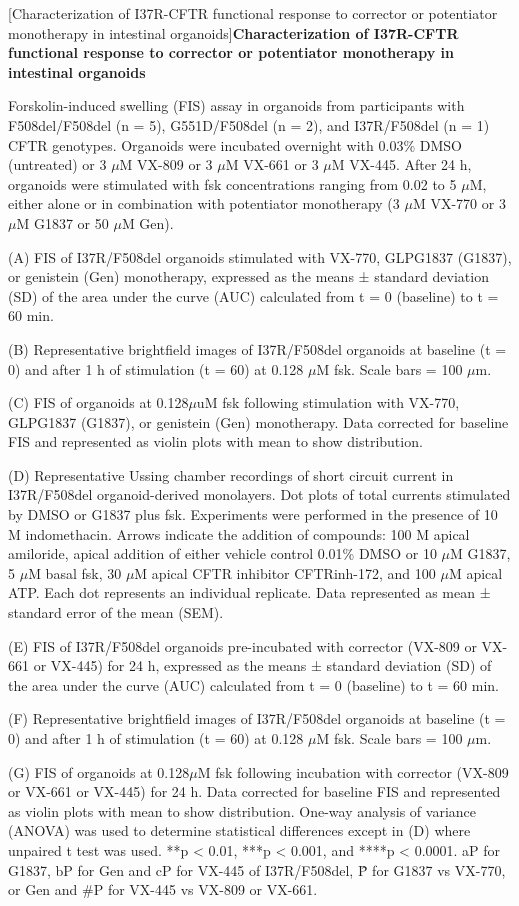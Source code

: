 [Characterization of I37R-CFTR functional response to corrector or potentiator monotherapy in intestinal organoids]{\textbf{Characterization of I37R-CFTR functional response to corrector or potentiator monotherapy in intestinal organoids}}{%
Forskolin-induced swelling (FIS) assay in organoids from participants with F508del/F508del (n = 5), G551D/F508del (n = 2), and I37R/F508del (n = 1) CFTR genotypes. Organoids were incubated overnight with 0.03\% DMSO (untreated) or 3 $\mu$M VX-809 or 3 $\mu$M VX-661 or 3 $\mu$M VX-445. After 24 h, organoids were stimulated with fsk concentrations ranging from 0.02 to 5 $\mu$M, either alone or in combination with potentiator monotherapy (3 $\mu$M VX-770 or 3 $\mu$M G1837 or 50 $\mu$M Gen).

(A) FIS of I37R/F508del organoids stimulated with VX-770, GLPG1837 (G1837), or genistein (Gen) monotherapy, expressed as the means ± standard deviation (SD) of the area under the curve (AUC) calculated from t = 0 (baseline) to t = 60 min.

(B) Representative brightfield images of I37R/F508del organoids at baseline (t = 0) and after 1 h of stimulation (t = 60) at 0.128 $\mu$M fsk. Scale bars = 100 $\mu$m.

(C) FIS of organoids at 0.128$\mu$uM fsk following stimulation with VX-770, GLPG1837 (G1837), or genistein (Gen) monotherapy. Data corrected for baseline FIS and represented as violin plots with mean to show distribution.

(D) Representative Ussing chamber recordings of short circuit current in I37R/F508del organoid-derived monolayers. Dot plots of total currents stimulated by DMSO or G1837 plus fsk. Experiments were performed in the presence of 10 M indomethacin. Arrows indicate the addition of compounds: 100 M apical amiloride, apical addition of either vehicle control 0.01\% DMSO or 10 $\mu$M G1837, 5 $\mu$M basal fsk, 30 $\mu$M apical CFTR inhibitor CFTRinh-172, and 100 $\mu$M apical ATP. Each dot represents an individual replicate. Data represented as mean ± standard error of the mean (SEM).

(E) FIS of I37R/F508del organoids pre-incubated with corrector (VX-809 or VX-661 or VX-445) for 24 h, expressed as the means ± standard deviation (SD) of the area under the curve (AUC) calculated from t = 0 (baseline) to t = 60 min.

(F) Representative brightfield images of I37R/F508del organoids at baseline (t = 0) and after 1 h of stimulation (t = 60) at 0.128 $\mu$M fsk. Scale bars = 100 $\mu$m.

(G) FIS of organoids at 0.128$\mu$M fsk following incubation with corrector (VX-809 or VX-661 or VX-445) for 24 h. Data corrected for baseline FIS and represented as violin plots with mean to show distribution. One-way analysis of variance (ANOVA) was used to determine statistical differences except in (D) where unpaired t test was used. **p < 0.01, ***p < 0.001, and ****p < 0.0001. aP for G1837, bP for Gen and cP for VX-445 of I37R/F508del, \^P for G1837 vs VX-770, or Gen and \#P for VX-445 vs VX-809 or VX-661.
}


